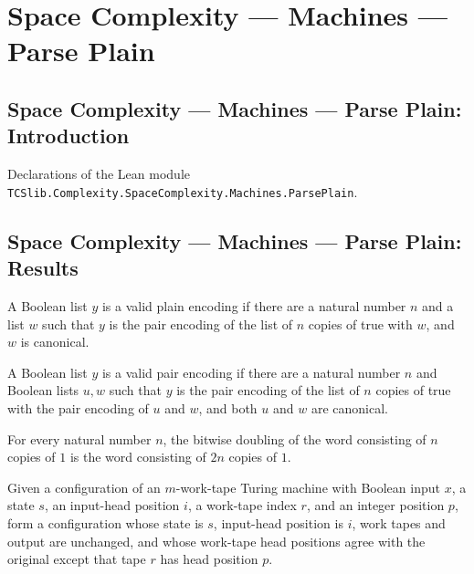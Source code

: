 \section{Space Complexity --- Machines --- Parse Plain}
\subsection*{Space Complexity --- Machines --- Parse Plain: Introduction}

Declarations of the Lean module \texttt{TCSlib.Complexity.SpaceComplexity.Machines.ParsePlain}.

\subsection*{Space Complexity --- Machines --- Parse Plain: Results}

\begin{definition}
\label{Complexity.LogProg.ValidPlain}
\leanok
{}
A Boolean list $y$ is a valid plain encoding if there are a natural number $n$ and a
list $w$ such that $y$ is the pair encoding of the list of $n$ copies of true with $w$,
and $w$ is canonical.
\end{definition}

\begin{definition}
\label{Complexity.LogProg.ValidPair}
\leanok
{}
A Boolean list $y$ is a valid pair encoding if there are a natural number $n$ and
Boolean lists $u,w$ such that $y$ is the pair encoding of the list of $n$ copies of true
with the pair encoding of $u$ and $w$, and both $u$ and $w$ are canonical.
\end{definition}

\begin{lemma}
\label{Complexity.LogProg.dbl_replicate}
\leanok
{}
For every natural number $n$, the bitwise doubling of the word consisting of $n$ copies
of $1$ is the word consisting of $2n$ copies of $1$.
\end{lemma}

\begin{definition}
\label{Complexity.LogProg.xCfg}
\leanok
{}
Given a configuration of an $m$-work-tape Turing machine with Boolean input $x$, a state
$s$, an input-head position $i$, a work-tape index $r$, and an integer position $p$,
form a configuration whose state is $s$, input-head position is $i$, work tapes and
output are unchanged, and whose work-tape head positions agree with the original except
that tape $r$ has head position $p$.
\end{definition}

